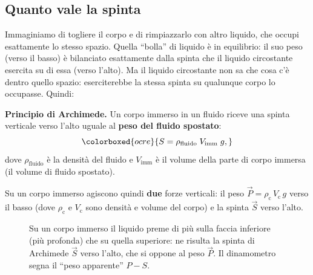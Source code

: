 \subsection{Quanto vale la spinta}
Immaginiamo di togliere il corpo e di rimpiazzarlo con altro liquido, che occupi esattamente lo stesso spazio. Quella ``bolla'' di liquido è in equilibrio: il suo peso (verso il basso) è bilanciato esattamente dalla spinta che il liquido circostante esercita su di essa (verso l'alto). Ma il liquido circostante non sa che cosa c'è dentro quello spazio: eserciterebbe la stessa spinta su qualunque corpo lo occupasse. Quindi:

\begin{definizione}
\textbf{Principio di Archimede.} Un corpo immerso in un fluido riceve una spinta verticale verso l'alto uguale al \textbf{peso del fluido spostato}:
\[ \colorboxed{ocre}{ S = \rho_\text{fluido}\; V_\text{imm}\; g, } \]
dove $\rho_\text{fluido}$ è la densità del fluido e $V_\text{imm}$ è il volume della parte di corpo immersa (il volume di fluido spostato).
\end{definizione}

Su un corpo immerso agiscono quindi \textbf{due} forze verticali: il peso $\vec P = \rho_\text{c}\,V_\text{c}\,g$ verso il basso (dove $\rho_\text{c}$ e $V_\text{c}$ sono densità e volume del corpo) e la spinta $\vec S$ verso l'alto.

\begin{figure}[!htbp]
    \centering
    \caption{Su un corpo immerso il liquido preme di più sulla faccia inferiore (più profonda) che su quella superiore: ne risulta la spinta di Archimede $\vec S$ verso l'alto, che si oppone al peso $\vec P$. Il dinamometro segna il ``peso apparente'' $P-S$.}
    \label{fig:archimede}
\end{figure}

